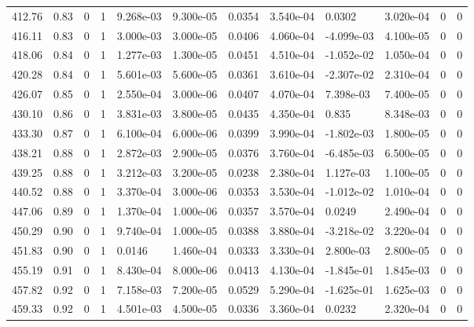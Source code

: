 \documentclass[preview]{standalone}
\begin{document}
{{{{{{{{{{{{{{{\begin{tabular}{L{1.2cm}C{1.2cm} C{0.3cm}C{0.5cm} C{1.4cm}C{1.4cm} C{1.4cm}C{1.4cm} C{1.6cm}C{1.6cm} C{1.6cm}C{1.6cm}}
  412.76  &  0.83  & 0     &  1 &  9.268e-03  & 9.300e-05  &  0.0354&   3.540e-04& 0.0302 & 3.020e-04   &  0 & 0  \\ 
  416.11  &  0.83  & 0     &  1 &  3.000e-03  & 3.000e-05  &  0.0406&   4.060e-04& -4.099e-03 & 4.100e-05   &  0 & 0  \\ 
  418.06  &  0.84  & 0     &  1 &  1.277e-03  & 1.300e-05  &  0.0451&   4.510e-04& -1.052e-02 & 1.050e-04   &  0 & 0  \\ 
  420.28  &  0.84  & 0     &  1 &  5.601e-03  & 5.600e-05  &  0.0361&   3.610e-04& -2.307e-02 & 2.310e-04   &  0 & 0  \\ 
  426.07  &  0.85  & 0     &  1 &  2.550e-04  & 3.000e-06  &  0.0407&   4.070e-04& 7.398e-03 & 7.400e-05   &  0 & 0  \\ 
  430.10  &  0.86  & 0     &  1 &  3.831e-03  & 3.800e-05  &  0.0435&   4.350e-04& 0.835 & 8.348e-03   &  0 & 0  \\ 
  433.30  &  0.87  & 0     &  1 &  6.100e-04  & 6.000e-06  &  0.0399&   3.990e-04& -1.802e-03 & 1.800e-05   &  0 & 0  \\ 
  438.21  &  0.88  & 0     &  1 &  2.872e-03  & 2.900e-05  &  0.0376&   3.760e-04& -6.485e-03 & 6.500e-05   &  0 & 0  \\ 
  439.25  &  0.88  & 0     &  1 &  3.212e-03  & 3.200e-05  &  0.0238&   2.380e-04& 1.127e-03 & 1.100e-05   &  0 & 0  \\ 
  440.52  &  0.88  & 0     &  1 &  3.370e-04  & 3.000e-06  &  0.0353&   3.530e-04& -1.012e-02 & 1.010e-04   &  0 & 0  \\ 
  447.06  &  0.89  & 0     &  1 &  1.370e-04  & 1.000e-06  &  0.0357&   3.570e-04& 0.0249 & 2.490e-04   &  0 & 0  \\ 
  450.29  &  0.90  & 0     &  1 &  9.740e-04  & 1.000e-05  &  0.0388&   3.880e-04& -3.218e-02 & 3.220e-04   &  0 & 0  \\ 
  451.83  &  0.90  & 0     &  1 &  0.0146  & 1.460e-04  &  0.0333&   3.330e-04& 2.800e-03 & 2.800e-05   &  0 & 0  \\ 
  455.19  &  0.91  & 0     &  1 &  8.430e-04  & 8.000e-06  &  0.0413&   4.130e-04& -1.845e-01 & 1.845e-03   &  0 & 0  \\ 
  457.82  &  0.92  & 0     &  1 &  7.158e-03  & 7.200e-05  &  0.0529&   5.290e-04& -1.625e-01 & 1.625e-03   &  0 & 0  \\ 
  459.33  &  0.92  & 0     &  1 &  4.501e-03  & 4.500e-05  &  0.0336&   3.360e-04& 0.0232 & 2.320e-04   &  0 & 0  \\ 
\hline 
\end{tabular} 

}}}}}}}}}}}}}}}
\end{document}
